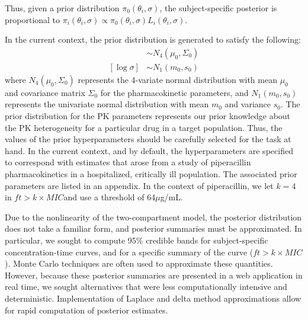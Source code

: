 \documentclass{article}\usepackage[]{graphicx}\usepackage[]{color}
\newcommand{\mic}{$ft > k \times MIC$}
\begin{document}
\noindent Thus, given a prior distribution $\pi_0(\theta_i, \sigma)$, the subject-specific posterior is proportional to $\pi_i(\theta_i, \sigma) \propto \pi_0(\theta_i,\sigma)L_i(\theta_i,\sigma)$.

In the current context, the prior distribution is generated to satisfy the following:
\begin{align}
[\log \theta_i] &\sim N_4(\mu_0, \Sigma_0) \\
[\log \sigma] &\sim N_1(m_0, s_0)
\end{align}
\noindent where $N_4(\mu_0, \Sigma_0)$ represents the 4-variate normal distribution with mean $\mu_0$ and covariance matrix $\Sigma_0$ for the pharmacokinetic parameters, and $N_1(m_0, s_0)$ represents the univariate normal distribution with mean $m_0$ and variance $s_0$. The prior distribution for the PK parameters represents our prior knowledge about the PK heterogeneity for a particular drug in a target population. Thus, the values of the prior hyperparameters should be carefully selected for the task at hand. In the current context, and by default, the hyperparameters are specified to correspond with estimates that arose from a study of piperacillin pharmacokinetics in a hospitalized, critically ill population. The associated prior parameters are listed in an appendix. In the context of piperacillin, we let $k=4$ in \mic and use a threshold of 64$\mu$g/mL.

Due to the nonlinearity of the two-compartment model, the posterior distribution does not take a familiar form, and posterior summaries must be approximated. In particular, we sought to compute 95\% credible bands for subject-specific concentration-time curves, and for a specific summary of the curve (\mic). Monte Carlo techniques are often used to approximate these quantities. However, because these posterior summaries are presented in a web application in real time, we sought alternatives that were less computationally intensive and deterministic. Implementation of Laplace and delta method approximations allow for rapid computation of posterior estimates.
\end{document}
